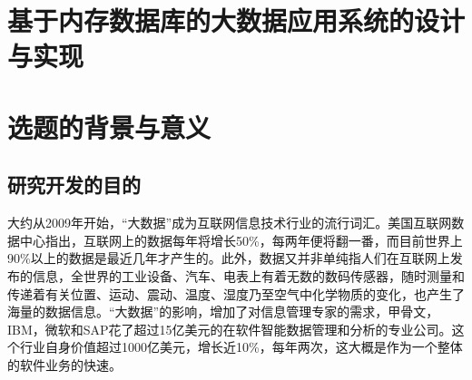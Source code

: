 \documentclass[proposal]{zjutreport}
\begin{document}



\frontmatter

\begingroup %
\let\clearpage\relax %

\titleformat{\chapter}[block]{\sihao\heiti\filcenter\bfseries}{\CJKnumber{\thechapter}}{1ex}{}{} %
\chapter*{基于内存数据库的大数据应用系统的设计与实现}
{} %


\mainmatter
\chapter{选题的背景与意义}
\section{研究开发的目的}
大约从2009年开始，“大数据”成为互联网信息技术行业的流行词汇。美国互联网数据中心指出，互联网上的数据每年将增长50\%，每两年便将翻一番，而目前世界上90\%以上的数据是最近几年才产生的。此外，数据又并非单纯指人们在互联网上发布的信息，全世界的工业设备、汽车、电表上有着无数的数码传感器，随时测量和传递着有关位置、运动、震动、温度、湿度乃至空气中化学物质的变化，也产生了海量的数据信息。“大数据”的影响，增加了对信息管理专家的需求，甲骨文，IBM，微软和SAP花了超过15亿美元的在软件智能数据管理和分析的专业公司。这个行业自身价值超过1000亿美元，增长近10\%，每年两次，这大概是作为一个整体的软件业务的快速。
\end{document}
